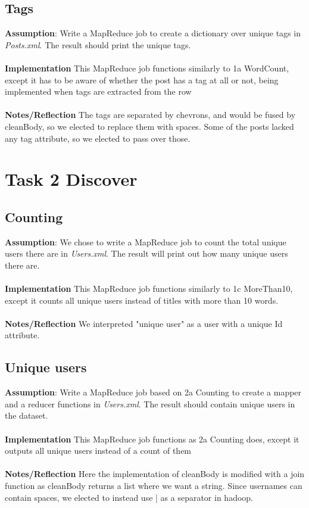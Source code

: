 \documentclass[fleqn,10pt]{wlscirep}
\begin{document}
\subsection{Tags}
\textbf{Assumption}: Write a MapReduce job to create a dictionary over unique tags in  \textit{Posts.xml}. The result should print the unique tags.\\ \\
\textbf{Implementation} This MapReduce job functions similarly to 1a WordCount, except it has to be aware of whether the post has a tag at all or not, being implemented when tags are extracted from the row \\ \\
\textbf{Notes/Reflection} The tags are separated by chevrons, and would be fused by cleanBody, so we elected to replace them with spaces. Some of the posts lacked any tag attribute, so we elected to pass over those.



\section{Task 2 Discover}

\subsection{Counting}
\textbf{Assumption}: We chose to write a MapReduce job to count the total unique users there are in \textit{Users.xml}. The result will print out how many unique users there are.\\ \\
\textbf{Implementation} This MapReduce job functions similarly to 1c MoreThan10, except it counts all unique users instead of titles with more than 10 words. \\ \\
\textbf{Notes/Reflection} We interpreted "unique user" as a user with a unique Id attribute.


\subsection{Unique users}
\textbf{Assumption}: Write a MapReduce job based on 2a Counting to create a mapper  and a reducer functions in \textit{Users.xml}. The result should contain unique users in the dataset.  \\ \\
\textbf{Implementation} This MapReduce job functions as 2a Counting does, except it outputs all unique users instead of a count of them \\ \\
\textbf{Notes/Reflection} Here the implementation of cleanBody is modified with a join function as cleanBody returns a list where we want a string. Since usernames can contain spaces, we elected to instead use | as a separator in hadoop.
 
\end{document}
